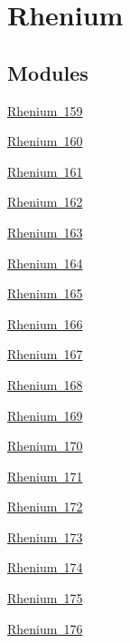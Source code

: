 \hypertarget{group___isotope_const-_rhenium}{}\section{Rhenium}
\label{group___isotope_const-_rhenium}
\subsection*{Modules}
\begin{DoxyCompactItemize}
\item 
\mbox{\hyperlink{group___isotope_const-_rhenium-_re159}{Rhenium 159}}
\item 
\mbox{\hyperlink{group___isotope_const-_rhenium-_re160}{Rhenium 160}}
\item 
\mbox{\hyperlink{group___isotope_const-_rhenium-_re161}{Rhenium 161}}
\item 
\mbox{\hyperlink{group___isotope_const-_rhenium-_re162}{Rhenium 162}}
\item 
\mbox{\hyperlink{group___isotope_const-_rhenium-_re163}{Rhenium 163}}
\item 
\mbox{\hyperlink{group___isotope_const-_rhenium-_re164}{Rhenium 164}}
\item 
\mbox{\hyperlink{group___isotope_const-_rhenium-_re165}{Rhenium 165}}
\item 
\mbox{\hyperlink{group___isotope_const-_rhenium-_re166}{Rhenium 166}}
\item 
\mbox{\hyperlink{group___isotope_const-_rhenium-_re167}{Rhenium 167}}
\item 
\mbox{\hyperlink{group___isotope_const-_rhenium-_re168}{Rhenium 168}}
\item 
\mbox{\hyperlink{group___isotope_const-_rhenium-_re169}{Rhenium 169}}
\item 
\mbox{\hyperlink{group___isotope_const-_rhenium-_re170}{Rhenium 170}}
\item 
\mbox{\hyperlink{group___isotope_const-_rhenium-_re171}{Rhenium 171}}
\item 
\mbox{\hyperlink{group___isotope_const-_rhenium-_re172}{Rhenium 172}}
\item 
\mbox{\hyperlink{group___isotope_const-_rhenium-_re173}{Rhenium 173}}
\item 
\mbox{\hyperlink{group___isotope_const-_rhenium-_re174}{Rhenium 174}}
\item 
\mbox{\hyperlink{group___isotope_const-_rhenium-_re175}{Rhenium 175}}
\item 
\mbox{\hyperlink{group___isotope_const-_rhenium-_re176}{Rhenium 176}}

\end{DoxyCompactItemize}
